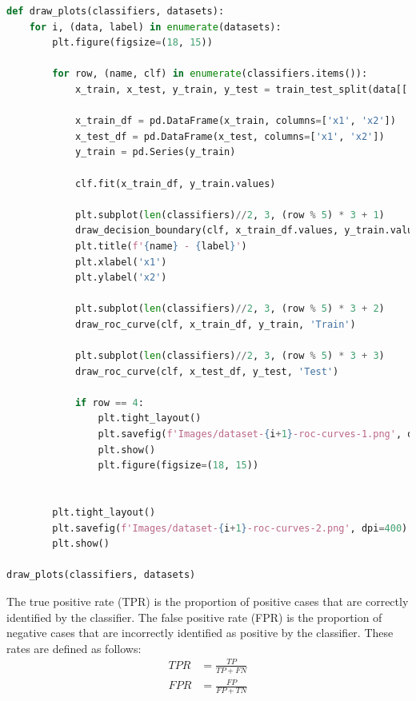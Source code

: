 \clearpage

\begin{lstlisting}[language=Python, caption=Generating Decision Boundaries and ROC Curves, label={lst:Q5.1}]
def draw_plots(classifiers, datasets):
    for i, (data, label) in enumerate(datasets):
        plt.figure(figsize=(18, 15))
        
        for row, (name, clf) in enumerate(classifiers.items()):
            x_train, x_test, y_train, y_test = train_test_split(data[['x1', 'x2']], data['y'], test_size=0.2, random_state=42)
            
            x_train_df = pd.DataFrame(x_train, columns=['x1', 'x2'])
            x_test_df = pd.DataFrame(x_test, columns=['x1', 'x2'])
            y_train = pd.Series(y_train)
            
            clf.fit(x_train_df, y_train.values)

            plt.subplot(len(classifiers)//2, 3, (row % 5) * 3 + 1)
            draw_decision_boundary(clf, x_train_df.values, y_train.values, size=5, edgecolor=None)
            plt.title(f'{name} - {label}')
            plt.xlabel('x1')
            plt.ylabel('x2')

            plt.subplot(len(classifiers)//2, 3, (row % 5) * 3 + 2)
            draw_roc_curve(clf, x_train_df, y_train, 'Train')

            plt.subplot(len(classifiers)//2, 3, (row % 5) * 3 + 3)
            draw_roc_curve(clf, x_test_df, y_test, 'Test')

            if row == 4:
                plt.tight_layout()
                plt.savefig(f'Images/dataset-{i+1}-roc-curves-1.png', dpi=400)
                plt.show()
                plt.figure(figsize=(18, 15))


        plt.tight_layout()
        plt.savefig(f'Images/dataset-{i+1}-roc-curves-2.png', dpi=400)
        plt.show()

draw_plots(classifiers, datasets)
\end{lstlisting}

\begin{definition*}
    The true positive rate (TPR) is the proportion of positive cases that are correctly identified by the classifier. The false positive rate (FPR) is the proportion of negative cases that are incorrectly identified as positive by the classifier. These rates are defined as follows:
    \begin{align*}
        TPR &= \frac{TP}{TP + FN} \\
        FPR &= \frac{FP}{FP + TN}
    \end{align*}
\end{definition*}

